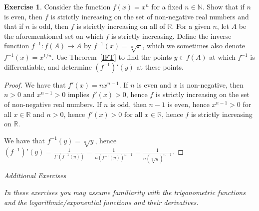 \documentclass[11pt]{article}
\newcommand{\bbN}{\mathbb{N}}
\newcommand{\bbR}{\mathbb{R}}
\renewcommand{\_}[1]{\underline{ #1 }}
\theoremstyle{definition}
\newtheorem{exercise}[theorem]{Exercise}
\numberwithin{equation}{subsection}
\begin{document}
\begin{exercise}
Consider the function $f(x)=x^n$ for a fixed $n\in\bbN$.  Show that if $n$ is even, then $f$ is strictly increasing
on the set of non-negative real numbers and that if $n$ is odd, then $f$ is strictly increasing on all of $\bbR$.
For a given $n$, let $A$ be the aforementioned set on which $f$ is strictly increasing.  Define the
inverse function $f^{-1}:f(A)\rightarrow A$ by $f^{-1}(x)=\sqrt[n]{x}$, which we sometimes also
denote $f^{-1}(x)=x^{1/n}$.  Use Theorem\ \ref{IFT} to find the points $y\in f(A)$ at
which $f^{-1}$ is differentiable, and determine $(f^{-1})'(y)$ at these points.

\begin{proof}
We have that $f'(x)=nx^{n-1}$. If $n$ is even and $x$ is non-negative, then $n>0$ and $x^{n-1}>0$ implies $f'(x)>0$, hence $f$ is strictly increasing on the set of non-negative real numbers. If $n$ is odd, then $n-1$ is even, hence $x^{n-1}>0$ for all $x\in \bbR$ and $n>0$, hence $f'(x)>0$ for all $x\in \bbR$, hence $f$ is strictly increasing on $\bbR$.

We have that $f^{-1}(y)=\sqrt[n]{y}$, hence $(f^{-1})'(y)=\frac{1}{f'(f^{-1}(y))}=\frac{1}{n (f^{-1}(y))^{n-1}} = \frac{1}{n(\sqrt[n]{y})^{n-1}}$.


\renewcommand\qedsymbol{QED}
\end{proof}


\end{exercise}
\bigskip

\begin{center}
{\em Additional Exercises}
\end{center}

{\em  In these exercises you may assume familiarity with the trigonometric functions and the logarithmic/exponential functions and their derivatives.}
\end{document}
